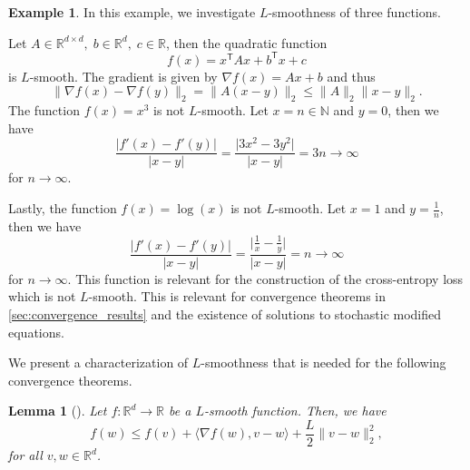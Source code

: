 \documentclass[12pt]{article}
\newtheorem{lemma}[lemma]{Lemma}
\theoremstyle{definition}
\newtheorem{example}[example]{Example}
\numberwithin{equation}{section}
\newcommand{\N}{\mathbb{N}}
\newcommand{\R}{\mathbb{R}}
\newcommand{\T}{\mathsf{T}}
\newcommand{\norm}[1]{\lVert{#1}\rVert_2}
\begin{document}
\begin{example}
  In this example, we investigate $L$-smoothness of three functions. 

  Let $A \in \R^{d \times d},\; b \in \R^d,\; c \in \R$, then the quadratic function
  \begin{equation*}
    f(x) = x^\T A x + b^\T x + c
  \end{equation*}
  is $L$-smooth. The gradient is given by $\nabla f(x)  = Ax + b$ and thus
  \begin{equation*}
    \norm{\nabla f(x) - \nabla f(y)} = \norm{A(x-y)} \leq \norm{A} \norm{x-y}.
  \end{equation*}
  The function $f(x) = x^3$ is not $L$-smooth. Let $x = n \in \N$ and $y = 0$, then we have
  \begin{equation*}
    \frac{\lvert f'(x) - f'(y) \rvert}{\lvert x - y \rvert} = \frac{\lvert3x^2 - 3 y^2 \rvert}{\lvert x-y \rvert} = 3n \rightarrow \infty
  \end{equation*}
  for $n \rightarrow \infty$.

  Lastly, the function $f(x) = \log(x)$ is not $L$-smooth. Let $x = 1$ and $y = \frac{1}{n}$, then we have
  \begin{equation*}
    \frac{\lvert f'(x) - f'(y) \rvert}{\lvert x - y \rvert} = \frac{\lvert \frac{1}{x}- \frac{1}{y} \rvert}{\lvert x-y \rvert} = n \rightarrow \infty
  \end{equation*}
  for $n \rightarrow \infty$. This function is relevant for the construction of the cross-entropy loss which is not $L$-smooth. This is relevant for convergence theorems in \autoref{sec:convergence_results} and the existence of solutions to stochastic modified equations.
\end{example}
We present a characterization of $L$-smoothness that is needed for the following convergence theorems.
\begin{lemma}[]
  Let $f : \mathbb{R}^d \rightarrow \mathbb{R}$ be a $L$-smooth function. Then, we have 
  \begin{equation}
    f(w) \leq f(v) + \langle \nabla f(w), v - w \rangle + \frac{L}{2} \norm{ v - w }^2,
  \end{equation}
  for all $v, w \in \mathbb{R}^d$.
\end{lemma}
\end{document}
